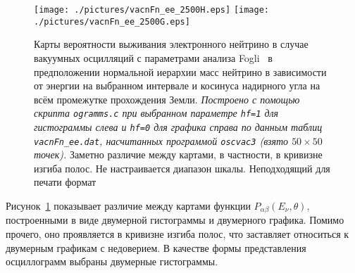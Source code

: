 \begin{figure}[!ht]
\texttt{[image: ./pictures/vacnFn\_ee\_2500H.eps]}
\texttt{[image: ./pictures/vacnFn\_ee\_2500G.eps]}
\caption{Карты вероятности выживания электронного нейтрино в случае вакуумных осцилляций с параметрами анализа Fogli~\cite{Fogli:2012ua} в предположении нормальной иерархии масс нейтрино в зависимости от энергии на выбранном интервале и косинуса надирного угла на всём промежутке прохождения Земли. \textit{Построено с помощью скрипта \texttt{ogramms.c} при выбранном параметре \texttt{hf=1} для гистограммы слева и \texttt{hf=0} для графика справа по данным таблиц \texttt{vacnFn\_ee.dat}, насчитанных программой \texttt{oscvac3} (взято $50\times50$ точек).} Заметно различие между картами, в частности, {\color{red}в кривизне изгиба полос}. {\color{red}Не настраивается диапазон шкалы.} {\color{magenta}Неподходящий для печати формат}}
\label{vacnFn_ee_HvsG}
\end{figure}

Рисунок~\ref{vacnFn_ee_HvsG} показывает различие между картами функции $P_{\alpha\beta}(E_{\nu},\theta)$, построенными в виде двумерной гистограммы и двумерного графика. Помимо прочего, оно проявляется {\color{red}в кривизне изгиба полос}, что заставляет относиться к двумерным графикам с недоверием. {\color{blue}В качестве формы представления осциллограмм выбраны двумерные гистограммы.}

